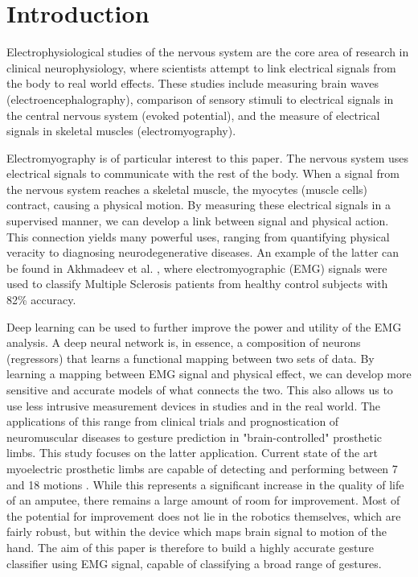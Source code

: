 \section{Introduction}

Electrophysiological studies of the nervous system are the core area of research in clinical neurophysiology, where scientists attempt to link electrical signals from the body to real world effects. These studies include measuring brain waves (electroencephalography), comparison of sensory stimuli to electrical signals in the central nervous system (evoked potential), and the measure of electrical signals in skeletal muscles (electromyography). \par
Electromyography is of particular interest to this paper. The nervous system uses electrical signals to communicate with the rest of the body. When a signal from the nervous system reaches a skeletal muscle, the myocytes (muscle cells) contract, causing a physical motion. By measuring these electrical signals in a supervised manner, we can develop a link between signal and physical action. This connection yields many powerful uses, ranging from quantifying physical veracity to diagnosing neurodegenerative diseases. An example of the latter can be found in Akhmadeev et al. \cite{graves}, where electromyographic (EMG) signals were used to classify Multiple Sclerosis patients from healthy control subjects with 82\% accuracy. \par
Deep learning can be used to further improve the power and utility of the EMG analysis. A deep neural network is, in essence, a composition of neurons (regressors) that learns a functional mapping between two sets of data. By learning a mapping between EMG signal and physical effect, we can develop more sensitive and accurate models of what connects the two. This also allows us to use less intrusive measurement devices in studies and in the real world. The applications of this range from clinical trials and prognostication of neuromuscular diseases to gesture prediction in "brain-controlled" prosthetic limbs. This study focuses on the latter application.
Current state of the art myoelectric prosthetic limbs  are capable of detecting and performing between 7 and 18 motions \cite{myohandpro} \cite{ottoblock}. While this represents a significant increase in the quality of life of an amputee, there remains a large amount of room for improvement. Most of the potential for improvement does not lie in the robotics themselves, which are fairly robust, but within the device which maps brain signal to motion of the hand. The aim of this paper is therefore to build a highly accurate gesture classifier using EMG signal, capable of classifying a broad range of gestures. \par
